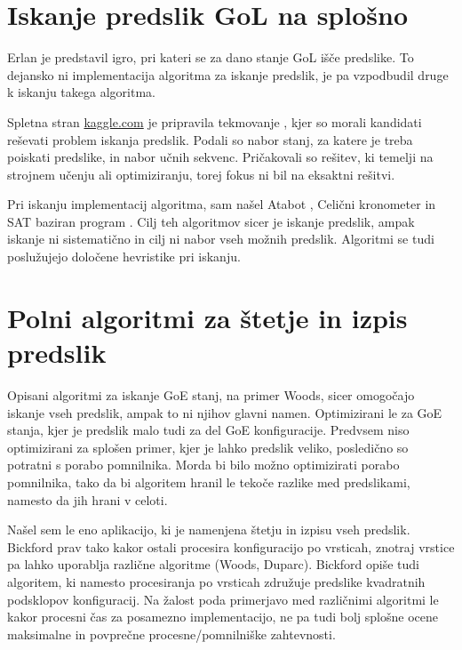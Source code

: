 \documentclass[12pt,a4paper,openany,twoside]{book}
\begin{document}
\section{Iskanje predslik GoL na splošno}

Erlan \cite{Erlan2012} je predstavil igro, pri kateri se za dano stanje
GoL išče predslike. To dejansko ni implementacija algoritma za iskanje predslik,
je pa vzpodbudil druge k iskanju takega algoritma.

Spletna stran \url{kaggle.com} je pripravila tekmovanje \cite{kaggle2013},
kjer so morali kandidati reševati problem iskanja predslik. Podali so
nabor stanj, za katere je treba poiskati predslike, in nabor učnih sekvenc.
Pričakovali so rešitev, ki temelji na strojnem učenju ali optimiziranju,
torej fokus ni bil na eksaktni rešitvi.

Pri iskanju implementacij algoritma, sam našel Atabot \cite{Borah2013},
Celični kronometer \cite{Duxbury2013} in SAT baziran program \cite{Pigorsch2015}.
Cilj teh algoritmov sicer je iskanje predslik, ampak iskanje ni sistematično
in cilj ni nabor vseh možnih predslik.
Algoritmi se tudi poslužujejo določene hevristike pri iskanju.

\section{Polni algoritmi za štetje in izpis predslik}

Opisani algoritmi za iskanje GoE stanj, na primer Woods,
sicer omogočajo iskanje vseh predslik, ampak to ni njihov glavni namen.
Optimizirani le za GoE stanja, kjer je predslik malo tudi za del GoE konfiguracije.
Predvsem niso optimizirani za splošen primer, kjer je lahko predslik veliko,
posledično so potratni s porabo pomnilnika.
Morda bi bilo možno optimizirati porabo pomnilnika,
tako da bi algoritem hranil le tekoče razlike med predslikami, namesto da jih hrani v celoti.

Našel sem le eno aplikacijo, ki je namenjena štetju in izpisu vseh predslik.
Bickford \cite{Bickford2012} prav tako kakor ostali procesira konfiguracijo
po vrsticah, znotraj vrstice pa lahko uporablja različne algoritme (Woods, Duparc).
Bickford opiše tudi algoritem, ki namesto procesiranja po vrsticah združuje predslike
kvadratnih podsklopov konfiguracij. Na žalost poda primerjavo med različnimi algoritmi
le kakor procesni čas za posamezno implementacijo, ne pa tudi bolj splošne
ocene maksimalne in povprečne procesne/pomnilniške zahtevnosti.
\end{document}
